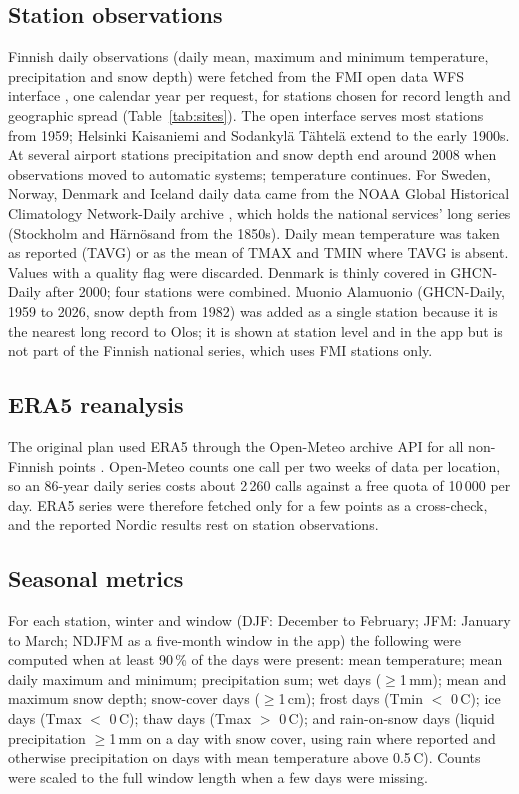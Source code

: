 \documentclass[11pt,a4paper]{article}
\newcommand{\degC}{\textdegree{}C}
\begin{document}
\subsection{Station observations}
Finnish daily observations (daily mean, maximum and minimum temperature, precipitation and snow depth) were fetched from the FMI open data WFS interface \cite{fmi_opendata}, one calendar year per request, for \nStationsFI{} stations chosen for record length and geographic spread (Table~\ref{tab:sites}). The open interface serves most stations from 1959; Helsinki Kaisaniemi and Sodankylä Tähtelä extend to the early 1900s. At several airport stations precipitation and snow depth end around 2008 when observations moved to automatic systems; temperature continues. For Sweden, Norway, Denmark and Iceland daily data came from the NOAA Global Historical Climatology Network-Daily archive \cite{menne2012}, which holds the national services' long series (Stockholm and Härnösand from the 1850s). Daily mean temperature was taken as reported (TAVG) or as the mean of TMAX and TMIN where TAVG is absent. Values with a quality flag were discarded. Denmark is thinly covered in GHCN-Daily after 2000; four stations were combined. Muonio Alamuonio (GHCN-Daily, 1959 to 2026, snow depth from 1982) was added as a single station because it is the nearest long record to Olos; it is shown at station level and in the app but is not part of the Finnish national series, which uses FMI stations only.

\subsection{ERA5 reanalysis}
The original plan used ERA5 through the Open-Meteo archive API for all non-Finnish points \cite{openmeteo,hersbach2020}. Open-Meteo counts one call per two weeks of data per location, so an 86-year daily series costs about 2\,260 calls against a free quota of 10\,000 per day. ERA5 series were therefore fetched only for a few points as a cross-check, and the reported Nordic results rest on station observations.

\subsection{Seasonal metrics}
For each station, winter and window (DJF: December to February; JFM: January to March; NDJFM as a five-month window in the app) the following were computed when at least 90\,\% of the days were present: mean temperature; mean daily maximum and minimum; precipitation sum; wet days ($\geq$1\,mm); mean and maximum snow depth; snow-cover days ($\geq$1\,cm); frost days (Tmin $<$ 0\,\degC); ice days (Tmax $<$ 0\,\degC); thaw days (Tmax $>$ 0\,\degC); and rain-on-snow days (liquid precipitation $\geq$1\,mm on a day with snow cover, using rain where reported and otherwise precipitation on days with mean temperature above 0.5\,\degC). Counts were scaled to the full window length when a few days were missing.
\end{document}
